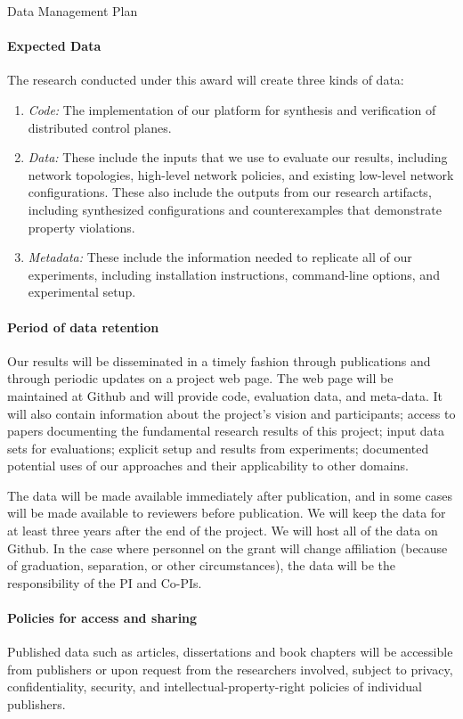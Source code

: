 \documentclass[12pt]{article}
\begin{document}
 \begin{large}
\begin{center}
Data Management Plan
\end{center}
\end{large}
\setcounter{page}{1}

\paragraph{Expected Data} The research conducted under this award will
create three kinds of data:

\begin{enumerate}
\item \textit{Code:} The implementation of our platform for synthesis and verification of distributed control planes.

\item \textit{Data:} These include the inputs that we use to evaluate our results, including network topologies, high-level network policies, and existing low-level network configurations.  These also include the outputs from our research artifacts, including synthesized configurations and counterexamples that demonstrate property violations.

\item \textit{Metadata:} These include the information needed to
  replicate all of our experiments, including installation instructions,
  command-line options, and experimental
  setup.
\end{enumerate}

\paragraph{Period of data retention} Our results will be disseminated in
a timely fashion through publications and through periodic updates on
a project web page. The web page will be maintained at Github and will
provide code, evaluation data, and meta-data.  It will also contain information about the project's
vision and participants; access to papers documenting the fundamental
research results of this project; input data sets for evaluations;
explicit setup and results from experiments; documented potential uses
of our approaches and their applicability to other domains. 

The data will be made available immediately after
publication, and in some cases will be made available to reviewers
before publication. We will keep the data for at least three years
after the end of the project. We will host all of the data on Github. In the case where personnel on the grant will change affiliation
(because of graduation, separation, or other circumstances), the data
will be the responsibility of the PI and Co-PIs. 

\paragraph{Policies for access and sharing} 
Published data such as articles, dissertations and book chapters will
be accessible from publishers or upon request from the researchers
involved, subject to privacy, confidentiality, security, and
intellectual-property-right policies of individual publishers.
\end{document}

